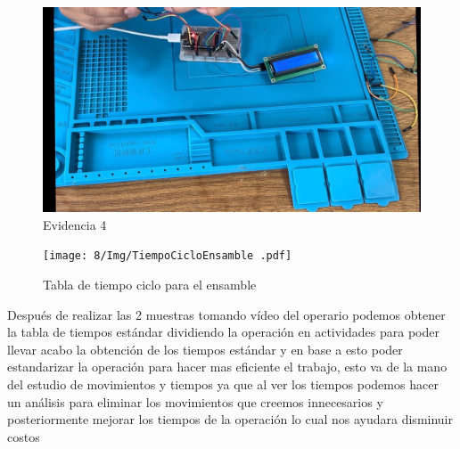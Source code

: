     \begin{figure}[H]
        \centering
        \includegraphics[trim = {0mm 0mm 0mm 0mm},clip,scale=0.2]{8/Img/Evidencia 4.pdf}
        \caption{Evidencia 4}
        \label{Evidencia 4}
    \end{figure}
    
    
    
    \begin{figure}[H]
        \centering
        \texttt{[image: 8/Img/TiempoCicloEnsamble .pdf]}
        \caption{Tabla de tiempo ciclo para el ensamble}
        \label{Tiempo ciclo}
    \end{figure}
    
    Después de realizar las 2 muestras tomando vídeo del operario podemos obtener la tabla de tiempos estándar dividiendo la operación en actividades para poder llevar acabo la obtención de los tiempos estándar y en base a esto poder estandarizar la operación para hacer mas eficiente el trabajo, esto va de la mano del estudio de movimientos y tiempos ya que al ver los tiempos podemos hacer un análisis para eliminar los movimientos que creemos innecesarios y posteriormente mejorar los tiempos de la operación lo cual nos ayudara disminuir costos 
    
